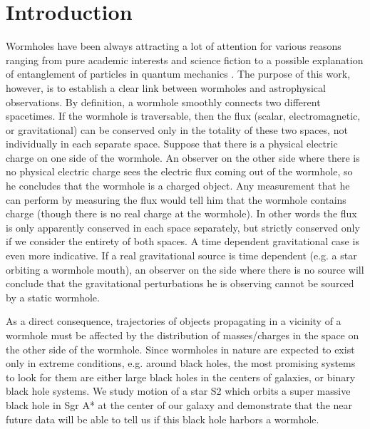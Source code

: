 \documentclass[prd, amsfonts, twocolumn, nofootinbib, showpacs]{revtex4}
\begin{document}
\section{ Introduction}
Wormholes have been always attracting a lot of attention for various reasons ranging from pure academic interests and science fiction to a possible explanation of entanglement of particles in quantum mechanics \cite{ER,geons,wheeler,Baum:1984mc,Hawking:1984hk,Coleman:1988tj,gibbons,Morris:1988cz, Morris:1988tu,visser,Maldacena:2013xja,Gratus:2019ned,Bronnikov:2019gsr,Bronnikov:2018vbs,Ovgun:2018xys,Jusufi:2017mav,Jusufi:2016leh,Krasnikov:2008kr}.  The purpose of this work, however, is to establish a clear link between wormholes and astrophysical observations.
By definition, a wormhole smoothly connects two different spacetimes. If the wormhole is traversable, then the flux (scalar, electromagnetic, or gravitational) can be conserved only in the totality of these two spaces, not individually in each separate space. Suppose that there is a physical electric charge on one side of the wormhole. An observer on the other side where there is no physical electric charge sees the electric flux coming out of the wormhole, so he concludes that the wormhole is a charged object. Any measurement that he can perform by measuring the flux would tell him that the wormhole contains charge (though there is no real charge at the wormhole). In other words the flux is only apparently conserved in each space separately, but strictly conserved only if we consider the entirety of both spaces.
 A time dependent gravitational case is even more indicative.  If a real gravitational source is time dependent (e.g. a star orbiting a wormhole mouth), an observer on the side where there is no source will conclude that the gravitational perturbations he is observing cannot be sourced by a static wormhole.

As a direct consequence, trajectories of objects propagating in a vicinity of a wormhole must be affected by the distribution of masses/charges in the space on the other side of the wormhole. Since wormholes in nature are expected to exist only in extreme conditions, e.g. around black holes, the most promising systems to look for them are either large black holes in the centers of galaxies, or binary black hole systems.  We study motion of a star S2 which orbits a super massive black hole in Sgr A*  at the center of our galaxy and demonstrate that the near future data will be able to tell us if this black hole harbors a wormhole.
\end{document}
